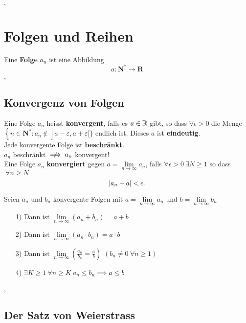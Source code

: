 \sep
\section{Folgen und Reihen}

\Def[2.1.1] Eine \textbf{Folge} $a_n$ ist eine Abbildung
\[
a: \mathbf{N}^{*} \longrightarrow \mathbf{R}
\] 
\sep
\subsection{Konvergenz von Folgen}

\Def[2.1.4] Eine Folge $a_n$ heisst \textbf{konvergent}, falls es $a \in \mathbb{R}$ gibt, so dass $\forall \epsilon > 0$ die Menge
$
\left\{n \in \mathbf{N}^{*}: a_{n} \notin\right] a-\varepsilon, a+\varepsilon[\}
$ endlich ist.
\Lemma[2.1.3] Dieses $a$ ist \textbf{eindeutig}. \\

\Lemma[2.1.5] Jede konvergente Folge ist \textbf{beschränkt}. \\
\Achtung $a_{n}$ beschränkt $\centernot\implies a_{n}$ konvergent! \\

\Lemma[2.1.6] Eine Folge $a_n$ \textbf{konvergiert} gegen ${a = \lim\limits_{n \rightarrow \infty} a_{n}}$, falls $ \forall \epsilon > 0 \ \exists N \geq 1$ so dass $\ \forall n\geq N$
\[
 \left\lvert a_n-a \right\rvert < \epsilon.
\]

\Satz[2.1.8] Seien $a_n$ und $b_n$ konvergente Folgen mit $a = \lim\limits_{n \rightarrow \infty} a_{n}$ und  $b = \lim\limits_{n \rightarrow \infty} b_{n}$
\begin{enumerate}
\item[1)] Dann ist $\lim\limits_{n \rightarrow \infty} (a_{n} + b_{n}) = a + b$
\item[2)] Dann ist $\lim\limits_{n \rightarrow \infty} (a_{n} \cdot b_{n}) = a \cdot b$
\item[3)] Dann ist $\lim\limits_{n \rightarrow \infty} (\frac{a_{n}}{b_{n}} = \frac{a}{b})$ $(b_{n} \neq 0 \ \forall n \geq 1)$
\item[4)] $\exists K \geq 1 \ \forall n \geq K \ a_{n} \leq b_{n} \implies a \leq b$

\end{enumerate}

\sep

\subsection{Der Satz von Weierstrass}

